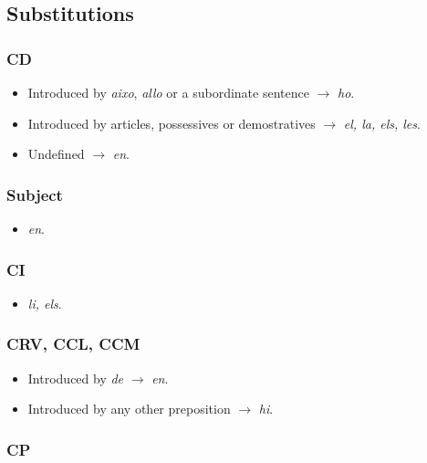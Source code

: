 \documentclass{article}
\begin{document}
\subsection*{Substitutions}

\subsubsection*{CD}

\begin{itemize}
    \item Introduced by \emph{aixo}, \emph{allo} or a subordinate sentence
    $\rightarrow$ \emph{ho}.
    \item Introduced by articles, possessives or demostratives $\rightarrow$
    \emph{el, la, els, les}.
    \item Undefined $\rightarrow$ \emph{en}.
\end{itemize}

\subsubsection*{Subject}

\begin{itemize}
    \item \emph{en}.
\end{itemize}

\subsubsection*{CI}

\begin{itemize}
    \item \emph{li, els}.
\end{itemize}

\subsubsection*{CRV, CCL, CCM}

\begin{itemize}
    \item Introduced by \emph{de} $\rightarrow$ \emph{en}.
    \item Introduced by any other preposition $\rightarrow$ \emph{hi}.
\end{itemize}

\subsubsection*{CP}
\end{document}
